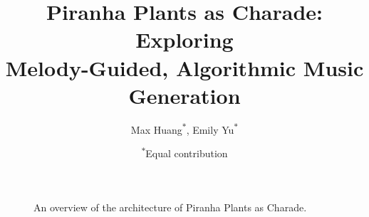 \documentclass[
	a4paper, %
	10pt, %
	twoside, %
]{LTJournalArticle}
\title{Piranha Plants as Charade: Exploring \\ Melody-Guided, Algorithmic Music Generation} %
\author{Max Huang\textsuperscript{$\ast$}, Emily Yu\textsuperscript{$\ast$}}
\date{\footnotesize\textsuperscript{$\ast$}Equal contribution}
\begin{document}
\maketitle %



\begin{figure*} %
    \begin{center}
        \resizebox{\linewidth}{!}{}
    \end{center}
    \caption{An overview of the architecture of Piranha Plants as Charade.}
    \label{fig:architecture}
\end{figure*}















\end{document}
